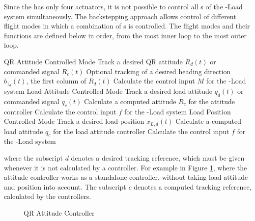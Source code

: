 Since the  has only four actuators, it is not possible to control all s of the -Load system simultaneously. The backstepping approach allows control of different flight modes in which a combination of s is controlled. The flight modes and their functions are defined below in order, from the most inner loop to the most outer loop.
\begin{outline}
	\1 QR Attitude Controlled Mode 
	\2 Track a desired QR attitude $ R_d(t) $ or commanded signal $ R_c(t) $
	\2Optional tracking of a desired heading direction $ b_{1_d}(t) $, the first column of $ R_d(t) $
	\2 Calculate the control input $ M $ for the -Load system
	\1 Load Attitude Controlled Mode 
	\2 Track a desired load attitude $ q_d(t) $ or commanded signal $ q_c(t) $
	\2 Calculate a computed  attitude $ R_c $ for the  attitude controller
	\2 Calculate the control input $ f $ for the -Load system	
	\1 Load Position Controlled Mode
	\2 Track a desired load position $ x_{L,d}(t) $
	\2 Calculate a computed load attitude $ q_c $ for the load attitude controller
	\2 Calculate the control input $ f $ for the -Load system		
\end{outline}
where the subscript $d $ denotes a desired tracking reference, which must be given whenever it is not calculated by a controller. For example in Figure \ref{fig:con.qrattalone}, where the  attitude controller works as a standalone controller, without taking load attitude and position into account.
The subscript $ c $ denotes a computed tracking reference, calculated by the controllers. 
\begin{figure}[h!]
	\centering
	\caption{QR Attitude Controller\label{fig:con.qrattalone}}
\end{figure}		



